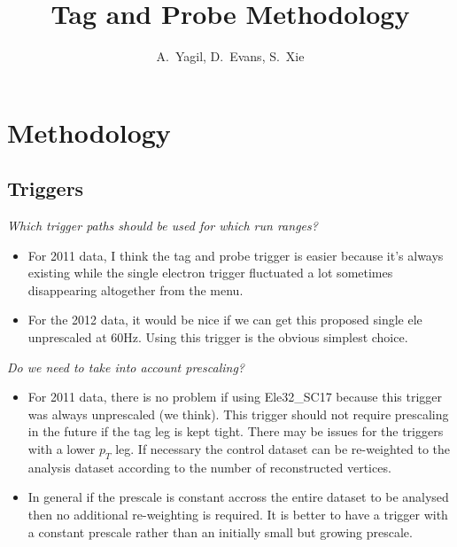 \documentclass[11pt,a4paper]{article}
\begin{document}
\title{Tag and Probe Methodology}
\author{A.~Yagil, D.~Evans, S.~Xie}

\maketitle

\tableofcontents
\newpage 

\section{Methodology}

\subsection{Triggers}
{\it Which trigger paths should be used for which run ranges?}\\

\begin{itemize}
    \item For 2011 data, I think the tag and probe trigger is easier because it's
always existing while the single electron trigger fluctuated a lot
sometimes disappearing altogether from the menu.
    \item For the 2012 data, it would be nice if we can get this proposed single ele
unprescaled at 60Hz. Using this trigger is the obvious simplest choice.
\end{itemize}

{\it Do we need to take into account prescaling?}\\

\begin{itemize}
    \item For 2011 data, there is no problem if using  Ele32\_SC17 because
this trigger was always unprescaled (we think).  This trigger should not
require prescaling in the future if the tag leg is kept tight.  There may be issues
for the triggers with a lower $p_{T}$ leg.  If necessary the control dataset 
can be re-weighted to the analysis dataset according to the number of reconstructed
vertices.
    \item In general if the prescale is constant accross the entire dataset
to be analysed then no additional re-weighting is required.  It is better to have a 
trigger with a constant prescale rather than an initially small but growing prescale.
\end{itemize}
\end{document}

